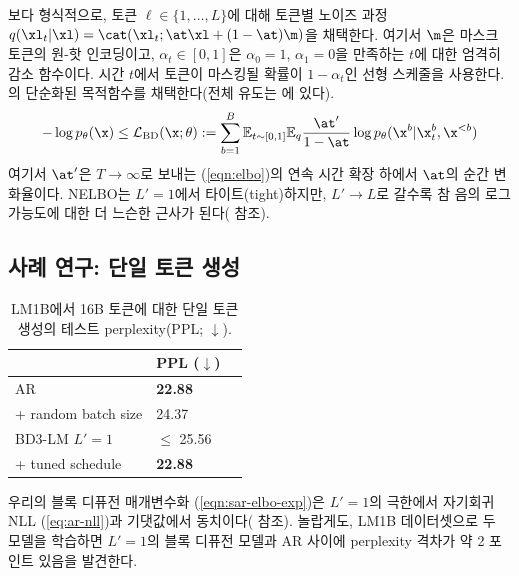 \documentclass{article} %
\def\algo{BD3-LM}
\begin{document}
보다 형식적으로, 토큰 $\ell \in \{1, \dots, L\}$에 대해 토큰별 노이즈 과정 $q(\xl_t| \xl) = \cat(\xl_t; \at \xl + (1 - \at) \m)$을 채택한다. 여기서 $\m$은 마스크 토큰의 원-핫 인코딩이고, $\alpha_t \in [0, 1]$은 $\alpha_{0} = 1$, $\alpha_{1} = 0$을 만족하는 $t$에 대한 엄격히 감소 함수이다. 시간 $t$에서 토큰이 마스킹될 확률이 $1-\alpha_t$인 선형 스케줄을 사용한다.
\cite{sahoo2024simple, shi2024simplified, ou2025your}의 단순화된 목적함수를 채택한다(전체 유도는 에 있다).
\begin{align}\label{eqn:sar-elbo-exp}
    - \log p_\theta(\x) \leq \mathcal{L}_\text{BD}(\x; \theta) :=  \sum_{b=1}^{B} \mathbb{E}_{t \sim [0, 1]} \mathbb{E}_{q} \frac{\at'}{1-\at} \log p_\theta(\x^b | \x_{t}^b, \x^{<b})
\end{align}
\noindent 여기서 $\at'$은 $T \rightarrow \infty$로 보내는 (\ref{eqn:elbo})의 연속 시간 확장 하에서 $\at$의 순간 변화율이다. NELBO는 $L'=1$에서 타이트(tight)하지만, $L' \rightarrow L$로 갈수록 참 음의 로그가능도에 대한 더 느슨한 근사가 된다( 참조).

\subsection{사례 연구: 단일 토큰 생성}
\begin{table}
    \small
  \vspace{-15pt}
  \caption{LM1B에서 16B 토큰에 대한 단일 토큰 생성의 테스트 perplexity(PPL; $\downarrow$).}
  \label{tab:bs1-var}
  \centering
  \begin{tabular}{lll}
    \toprule
    & PPL ($\downarrow$)  \\
    \midrule
    AR  & \textbf{22.88} \\
    \hspace{1em} + random batch size & 24.37 \\
    \midrule
    \algo{} $L'=1$ & $\leq$ 25.56\\
    \hspace{1em} + tuned schedule & \textbf{22.88} \\
    \bottomrule
  \end{tabular}
  \vspace{-10pt}
\end{table}
우리의 블록 디퓨전 매개변수화 (\ref{eqn:sar-elbo-exp})은 $L'=1$의 극한에서 자기회귀 NLL (\ref{eq:ar-nll})과 기댓값에서 동치이다( 참조). 놀랍게도, LM1B 데이터셋으로 두 모델을 학습하면 $L'=1$의 블록 디퓨전 모델과 AR 사이에 perplexity 격차가 약 2 포인트 있음을 발견한다.
\end{document}
